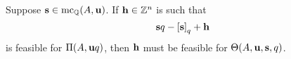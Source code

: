 \documentclass[11pt]{amsart}
\renewcommand{\!}[1]{{\color{red}\text{$\star$\,}#1\,$\star$}}
\newcommand{\ol}[1]{\overline{#1}}
\begin{document}
%



%
%
%
%


\begin{lemma}
\label{easy but important: L}
Suppose $\mathbf{s} \in \operatorname{mc}_{\mathbb{Q}}(A, \mathbf{u})$.   If  $\mathbf{h} \in \mathbb{Z}^n$ is such that \[ \mathbf{s}q - \left[ \mathbf{s} \right]_q + \mathbf{h}\] is feasible for $\Pi(A, \mathbf{u}q)$, then $\mathbf{h}$ must be feasible for $\Theta(A, \mathbf{u}, \mathbf{s}, q)$.
\end{lemma}
\end{document}

